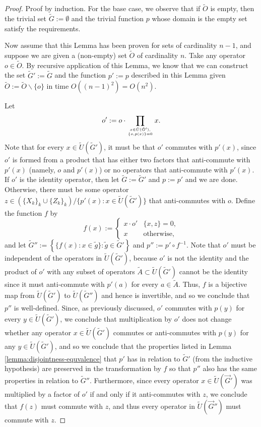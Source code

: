 \documentclass{amsbook}
\theoremstyle{plain}
\theoremstyle{definition}
\theoremstyle{remark}
\newcommand{\lst}{\vec}
\newcommand{\set}{\tilde}
\newcommand{\paren}[1]{\left(#1\right)}
\begin{document}
\begin{proof}
Proof by induction.  For the base case, we observe that if $\set O$ is empty, then the trivial set $\set G:=\emptyset$ and the trivial function $p$ whose domain is the empty set satisfy the requirements.

Now assume that this Lemma has been proven for sets of cardinality $n-1$, and suppose we are given a (non-empty) set $\set O$ of cardinality $n$.  Take any operator $o\in\set O$.  By recursive application of this Lemma, we know that we can construct the set $\set G':=\set G$ and the function $p':=p$ described in this Lemma given $\set O:=\set O\backslash\{o\}$ in time $O\paren{(n-1)^2}=O(n^2)$.

Let $$o':=o\cdot \prod_{x\in\set U(\set G'),\atop\{o,p(x)\}=0} x.$$  Note that for every $x\in\set U(\set G')$, it must be that $o'$ commutes with $p'(x)$, since $o'$ is formed from a product that has either two factors that anti-commute with $p'(x)$ (namely, $o$ and $p'(x)$) or no operators that anti-commute with $p'(x)$.  If $o'$ is the identity operator, then let $\set G:=\set G'$ and $p:=p'$ and we are done.  Otherwise, there must be some operator $z\in\paren{\{X_k\}_k \cup \{Z_k\}_k}\slash\{p'(x):x\in\set U(\set G')\}$ that anti-commutes with $o$.  Define the function $f$ by
$$f(x) :=
\begin{cases}
x \cdot o' & \{x,z\}=0, \\
x          & \text{otherwise},
\end{cases}
$$
and let $\set G'':=\left\{\{f(x):x\in\set g\}:\set g\in\set G'\right\}$ and $p'':=p'\circ f^{-1}$.  Note that $o'$ must be independent of the operators in $\set U(\set G')$, because $o'$ is not the identity and the product of $o'$ with any subset of operators $\set A\subset\set U(\set G')$ cannot be the identity since it must anti-commute with $p'(a)$ for every $a\in\set A$.  Thus, $f$ is a bijective map from $\set U(\set G')$ to $\set U(\set G'')$ and hence is invertible, and so we conclude that $p''$ is well-defined.  Since, as previously discussed, $o'$ commutes with $p(y)$ for every $y\in\set U(\set G')$, we conclude that multiplication by $o'$ does not change whether any operator $x\in\set U(\set G')$ commutes or anti-commutes with $p(y)$ for any $y\in\set U(\set G')$, and so we conclude that the properties listed in Lemma \ref{lemma:disjointness-equvalence} that $p'$ has in relation to $\set G'$ (from the inductive hypothesis) are preserved in the transformation by $f$ so that $p''$ also has the same properties in relation to $\set G''$.  Furthermore, since every operator $x\in\set U(\lst G')$ was multiplied by a factor of $o'$ if and only if it anti-commutes with $z$, we conclude that $f(z)$ must commute with $z$, and thus every operator in $\set U(\lst G'')$ must commute with $z$.


\end{proof}
\end{document}

